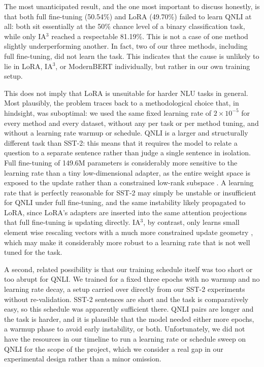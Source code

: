 \documentclass[11pt]{article}
\begin{document}
The most unanticipated result, and the one most important to
discuss honestly, is that both full fine-tuning (50.54\%) and LoRA
(49.70\%) failed to learn QNLI at all: both sit essentially at the
50\% chance level of a binary classification task, while only IA$^3$
reached a respectable 81.19\%. This is not a case of one method
slightly underperforming another. In fact, two of our three methods, including
full fine-tuning, did not learn the task. This indicates that
the cause is unlikely to lie in LoRA, IA$^3$, or ModernBERT individually,
but rather in our own training setup.

This does not imply that LoRA is unsuitable for harder NLU tasks
in general. Most plausibly, the
problem traces back to a methodological choice that, in hindsight,
was suboptimal: we used the same fixed learning rate of $2 \times 10^{-5}$
for every method and every dataset, without any per task or per method
tuning, and without a learning rate warmup or schedule. QNLI is a larger
and structurally different task than SST-2: this means that it requires the model to
relate a question to a separate sentence rather than judge a single
sentence in isolation. Full fine-tuning of 149.6M parameters is
considerably more sensitive to the learning rate than a tiny
low-dimensional adapter, as the entire weight space is exposed to the
update rather than a constrained low-rank subspace \cite{hu2021lora}. A learning rate that is perfectly reasonable
for SST-2 may simply be unstable or insufficient for QNLI under full
fine-tuning, and the same instability likely propagated to LoRA, since
LoRA's adapters are inserted into the same attention projections that
full fine-tuning is updating directly. IA$^3$, by contrast, only learns
small element wise rescaling vectors with a much more constrained update
geometry \cite{liu2022ia3}, which may make it considerably more robust to a learning rate
that is not well tuned for the task.

A second, related possibility is that our training schedule itself was
too short or too abrupt for QNLI. We trained for a fixed three epochs
with no warmup and no learning rate decay, a setup carried over directly
from our SST-2 experiments without re-validation. SST-2 sentences are
short and the task is comparatively easy, so this schedule was
apparently sufficient there. QNLI pairs are longer and the task is
harder, and it is plausible that the model needed either more epochs, a
warmup phase to avoid early instability, or both. Unfortunately, we did not have the resources in our timeline to run a learning rate or schedule sweep on
QNLI for the scope of the project, which we consider a real gap in our
experimental design rather than a minor omission.
\end{document}
